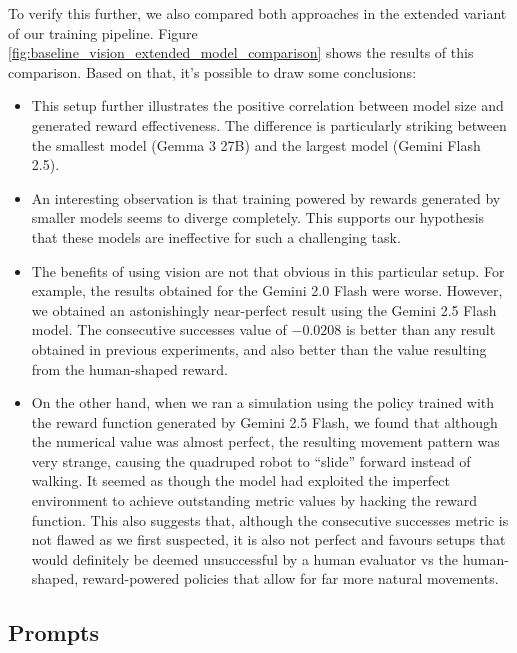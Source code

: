 \documentclass[10pt,twocolumn]{article}
\begin{document}
To verify this further, we also compared both approaches in the extended variant of our training pipeline. Figure \ref{fig:baseline_vision_extended_model_comparison} shows the results of this comparison. Based on that, it's possible to draw some conclusions:

\begin{itemize}
    \item This setup further illustrates the positive correlation between model size and generated reward effectiveness. The difference is particularly striking between the smallest model (Gemma 3 27B) and the largest model (Gemini Flash 2.5).
    \item An interesting observation is that training powered by rewards generated by smaller models seems to diverge completely. This supports our hypothesis that these models are ineffective for such a challenging task.
    \item The benefits of using vision are not that obvious in this particular setup. For example, the results obtained for the Gemini 2.0 Flash were worse. However, we obtained an astonishingly near-perfect result using the Gemini 2.5 Flash model. The consecutive successes value of $-0.0208$ is better than any result obtained in previous experiments, and also better than the value resulting from the human-shaped reward.
    \item On the other hand, when we ran a simulation using the policy trained with the reward function generated by Gemini 2.5 Flash, we found that although the numerical value was almost perfect, the resulting movement pattern was very strange, causing the quadruped robot to ``slide'' forward instead of walking. It seemed as though the model had exploited the imperfect environment to achieve outstanding metric values by hacking the reward function. This also suggests that, although the consecutive successes metric is not flawed as we first suspected, it is also not perfect and favours setups that would definitely be deemed unsuccessful by a human evaluator vs the human-shaped, reward-powered policies that allow for far more natural movements.
\end{itemize}

\subsection{Prompts}
\end{document}
